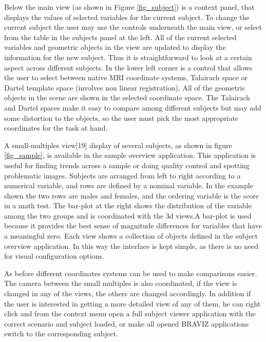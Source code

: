 \documentclass[utf8]{frontiersSCNS} %
\begin{document}
Below the main view (as shown in Figure \ref{fig_subject}) is a context panel, that displays the values of selected variables for the current subject. To change the current subject the user may use the controls underneath the main view, or select from the table in the subjects panel at the left. All of the current selected variables and geometric objects in the view are updated to display the information for the new subject. Thus it is straightforward to look at a certain aspect across different subjects. In the lower left corner is a control that allows the user to select between native MRI coordinate systems, Talairach space or Dartel template space (involves non linear registration). All of the geometric objects in the scene are shown in the selected coordinate space. The Talairach and Dartel spaces make it easy to compare among different subjects but may add some distortion to the objects, so the user must pick the most appropriate coordinates for the task at hand. 

A small-multiples view[19] display of several subjects, as shown in figure \ref{fig_sample}, is available in the sample overview application. This application is useful for finding trends across a sample or doing quality control and spotting problematic images. Subjects are arranged from left to right according to a numerical variable, and rows are defined by a nominal variable. In the example shown the two rows are males and females, and the ordering variable is the score in a math test. The bar-plot at the right shows the distribution of the variable among the two groups and is coordinated with the 3d views.A bar-plot is used because it provides the best sense of magnitude differences for variables that have a meaningful zero. Each view shows a collection of objects defined in the subject overview application. In this way the interface is kept simple, as there is no need for visual configuration options.

As before different coordinates systems can be used to make comparisons easier. The camera between the small multiples is also coordinated, if the view is changed in any of the views, the others are changed accordingly. In addition if the user is interested in getting a more detailed view of any of them, he can right click and from the context menu open a full subject viewer application with the correct scenario and subject loaded, or make all opened BRAVIZ applications switch to the corresponding subject.
\end{document}
